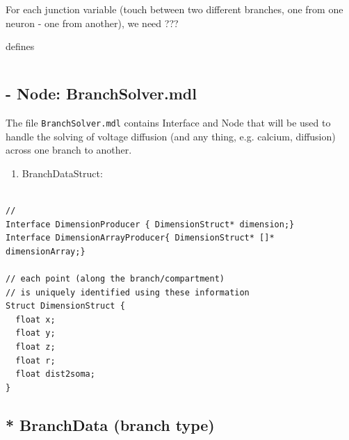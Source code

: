 For each junction variable (touch between two different branches, one from one
neuron - one from another), we need ???

defines
\begin{lstlisting}

\end{lstlisting}


% 


\subsection{- Node: BranchSolver.mdl}
\label{sec:BranchSolver.mdl}

The file \verb!BranchSolver.mdl! contains Interface and Node that will be used
to handle the solving of voltage diffusion (and any thing, e.g. calcium,
diffusion) across one branch to another.


\begin{enumerate}
  
  \item BranchDataStruct:  \label{sec:BranchDataStruct}
  
\end{enumerate}
\begin{lstlisting}

// 
Interface DimensionProducer { DimensionStruct* dimension;}
Interface DimensionArrayProducer{ DimensionStruct* []* dimensionArray;}

// each point (along the branch/compartment)
// is uniquely identified using these information
Struct DimensionStruct {
  float x; 
  float y;
  float z;
  float r;
  float dist2soma;
}
\end{lstlisting}



\subsection{* BranchData (branch type)}
\label{sec:BranchDataStruct}


